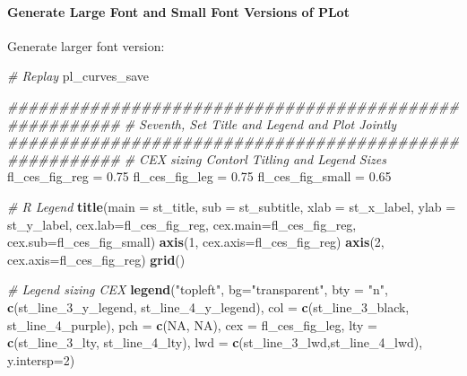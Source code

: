 \documentclass[
]{book}
\newenvironment{Shaded}{\begin{snugshade}}{\end{snugshade}}
\newcommand{\CommentTok}[1]{\textcolor[rgb]{0.56,0.35,0.01}{\textit{#1}}}
\newcommand{\DataTypeTok}[1]{\textcolor[rgb]{0.13,0.29,0.53}{#1}}
\newcommand{\DecValTok}[1]{\textcolor[rgb]{0.00,0.00,0.81}{#1}}
\newcommand{\FloatTok}[1]{\textcolor[rgb]{0.00,0.00,0.81}{#1}}
\newcommand{\KeywordTok}[1]{\textcolor[rgb]{0.13,0.29,0.53}{\textbf{#1}}}
\newcommand{\NormalTok}[1]{#1}
\newcommand{\OtherTok}[1]{\textcolor[rgb]{0.56,0.35,0.01}{#1}}
\newcommand{\StringTok}[1]{\textcolor[rgb]{0.31,0.60,0.02}{#1}}
\begin{document}
\hypertarget{generate-large-font-and-small-font-versions-of-plot}{%
\paragraph{Generate Large Font and Small Font Versions of PLot}\label{generate-large-font-and-small-font-versions-of-plot}}

Generate larger font version:

\begin{Shaded}
\begin{Highlighting}[]
\CommentTok{\# Replay}
\NormalTok{pl\_curves\_save}

\CommentTok{\#\#\#\#\#\#\#\#\#\#\#\#\#\#\#\#\#\#\#\#\#\#\#\#\#\#\#\#\#\#\#\#\#\#\#\#\#\#\#\#\#\#\#\#\#\#\#\#\#\#\#\#\#\#\#}
\CommentTok{\# Seventh, Set Title and Legend and Plot Jointly}
\CommentTok{\#\#\#\#\#\#\#\#\#\#\#\#\#\#\#\#\#\#\#\#\#\#\#\#\#\#\#\#\#\#\#\#\#\#\#\#\#\#\#\#\#\#\#\#\#\#\#\#\#\#\#\#\#\#\#}
\CommentTok{\# CEX sizing Contorl Titling and Legend Sizes}
\NormalTok{fl\_ces\_fig\_reg =}\StringTok{ }\FloatTok{0.75}
\NormalTok{fl\_ces\_fig\_leg =}\StringTok{ }\FloatTok{0.75}
\NormalTok{fl\_ces\_fig\_small =}\StringTok{ }\FloatTok{0.65}

\CommentTok{\# R Legend}
\KeywordTok{title}\NormalTok{(}\DataTypeTok{main =}\NormalTok{ st\_title, }\DataTypeTok{sub =}\NormalTok{ st\_subtitle, }\DataTypeTok{xlab =}\NormalTok{ st\_x\_label, }\DataTypeTok{ylab =}\NormalTok{ st\_y\_label,}
      \DataTypeTok{cex.lab=}\NormalTok{fl\_ces\_fig\_reg,}
      \DataTypeTok{cex.main=}\NormalTok{fl\_ces\_fig\_reg,}
      \DataTypeTok{cex.sub=}\NormalTok{fl\_ces\_fig\_small)}
\KeywordTok{axis}\NormalTok{(}\DecValTok{1}\NormalTok{, }\DataTypeTok{cex.axis=}\NormalTok{fl\_ces\_fig\_reg)}
\KeywordTok{axis}\NormalTok{(}\DecValTok{2}\NormalTok{, }\DataTypeTok{cex.axis=}\NormalTok{fl\_ces\_fig\_reg)}
\KeywordTok{grid}\NormalTok{()}

\CommentTok{\# Legend sizing CEX}
\KeywordTok{legend}\NormalTok{(}\StringTok{"topleft"}\NormalTok{,}
       \DataTypeTok{bg=}\StringTok{"transparent"}\NormalTok{,}
       \DataTypeTok{bty =} \StringTok{"n"}\NormalTok{,}
       \KeywordTok{c}\NormalTok{(st\_line\_}\DecValTok{3}\NormalTok{\_y\_legend, st\_line\_}\DecValTok{4}\NormalTok{\_y\_legend),}
       \DataTypeTok{col =} \KeywordTok{c}\NormalTok{(st\_line\_}\DecValTok{3}\NormalTok{\_black, st\_line\_}\DecValTok{4}\NormalTok{\_purple),}
       \DataTypeTok{pch =} \KeywordTok{c}\NormalTok{(}\OtherTok{NA}\NormalTok{, }\OtherTok{NA}\NormalTok{),}
       \DataTypeTok{cex =}\NormalTok{ fl\_ces\_fig\_leg,}
       \DataTypeTok{lty =} \KeywordTok{c}\NormalTok{(st\_line\_}\DecValTok{3}\NormalTok{\_lty, st\_line\_}\DecValTok{4}\NormalTok{\_lty),}
       \DataTypeTok{lwd =} \KeywordTok{c}\NormalTok{(st\_line\_}\DecValTok{3}\NormalTok{\_lwd,st\_line\_}\DecValTok{4}\NormalTok{\_lwd),}
       \DataTypeTok{y.intersp=}\DecValTok{2}\NormalTok{)}
\end{Highlighting}
\end{Shaded}
\end{document}
